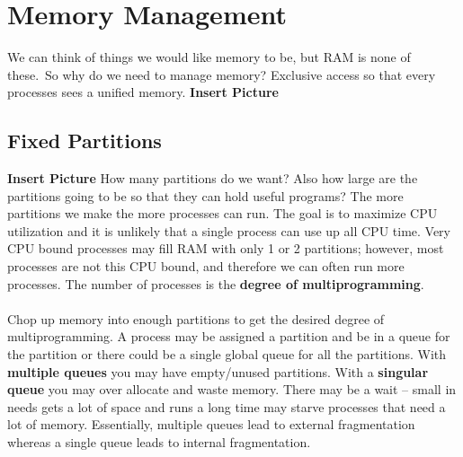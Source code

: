\documentclass[../base_file/cs1550_notes.tex]{subfiles}
\begin{document}
\chapter{Memory Management}
We can think of things we would like memory to be, but RAM is none of these.\
So why do we need to manage memory? Exclusive access so that every processes
sees a unified memory.
\textbf{Insert Picture}
\section{Fixed Partitions}
\textbf{Insert Picture}
How many partitions do we want? Also how large are the partitions going to be
so that they can hold useful programs?  The more partitions we make the more
processes can run. The goal is to maximize CPU utilization and it is unlikely
that a single process can use up all CPU time.  Very CPU bound processes may
fill RAM with only 1 or 2 partitions; however, most processes are
not this CPU bound, and therefore we can often run more processes.  The number
of processes is the \textbf{degree of multiprogramming}.\\\\
Chop up memory into enough partitions to get the desired degree of multiprogramming.
A process may be assigned a partition and be in a queue for the partition or there
could be a single global queue for all the partitions.  With \textbf{multiple queues}
you may have empty/unused partitions.  With a \textbf{singular queue} you may over
allocate and waste memory.  There may be a wait -- small in needs gets a lot of space
and runs a long time may starve processes that need a lot of memory.  Essentially,
multiple queues lead to external fragmentation whereas a single queue leads to 
internal fragmentation.
\end{document}
